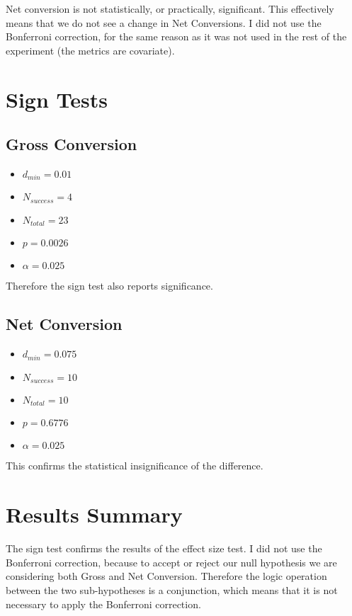 \documentclass[12pt,a4paper]{article}
\begin{document}
Net conversion is not statistically, or practically, significant. This
effectively means that we do not see a change in Net Conversions. I did not use
the Bonferroni correction, for the same reason as it was not used in the rest of
the experiment (the metrics are covariate).

\section{Sign Tests}
\subsection{Gross Conversion}
\begin{itemize}
\item $d_{min} = 0.01$
\item $N_{success} = 4$
\item $N_{total} = 23$
\item $p = 0.0026$
\item $\alpha = 0.025$
\end{itemize}

Therefore the sign test also reports significance.

\subsection{Net Conversion}
\begin{itemize}
\item $d_{min} = 0.075$
\item $N_{success} = 10$
\item $N_{total} = 10$
\item $p = 0.6776$
\item $\alpha = 0.025$
\end{itemize}

This confirms the statistical insignificance of the difference.

\section{Results Summary}
The sign test confirms the results of the effect size test. I did not use the
Bonferroni correction, because to accept or reject our null hypothesis we are
considering both Gross and Net Conversion. Therefore the logic operation between
the two sub-hypotheses is a conjunction, which means that it is not necessary to
apply the Bonferroni correction.
\end{document}
